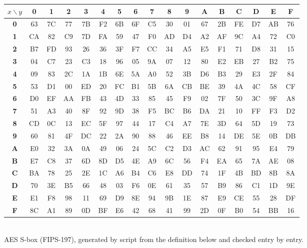 \begin{center}
\small\ttfamily\setlength{\tabcolsep}{4pt}\renewcommand{\arraystretch}{1.05}
\begin{tabular}{@{}>{\columncolor{acc!10}}c|*{16}{c}@{}}
\rowcolor{acc!10}$x\backslash y$ & \textbf{0}&\textbf{1}&\textbf{2}&\textbf{3}&\textbf{4}&\textbf{5}&\textbf{6}&\textbf{7}&\textbf{8}&\textbf{9}&\textbf{A}&\textbf{B}&\textbf{C}&\textbf{D}&\textbf{E}&\textbf{F}\\\hline
\textbf{0} & 63 & 7C & 77 & 7B & F2 & 6B & 6F & C5 & 30 & 01 & 67 & 2B & FE & D7 & AB & 76\\
\textbf{1} & CA & 82 & C9 & 7D & FA & 59 & 47 & F0 & AD & D4 & A2 & AF & 9C & A4 & 72 & C0\\
\textbf{2} & B7 & FD & 93 & 26 & 36 & 3F & F7 & CC & 34 & A5 & E5 & F1 & 71 & D8 & 31 & 15\\
\textbf{3} & 04 & C7 & 23 & C3 & 18 & 96 & 05 & 9A & 07 & 12 & 80 & E2 & EB & 27 & B2 & 75\\
\textbf{4} & 09 & 83 & 2C & 1A & 1B & 6E & 5A & A0 & 52 & 3B & D6 & B3 & 29 & E3 & 2F & 84\\
\textbf{5} & 53 & D1 & 00 & ED & 20 & FC & B1 & 5B & 6A & CB & BE & 39 & 4A & 4C & 58 & CF\\
\textbf{6} & D0 & EF & AA & FB & 43 & 4D & 33 & 85 & 45 & F9 & 02 & 7F & 50 & 3C & 9F & A8\\
\textbf{7} & 51 & A3 & 40 & 8F & 92 & 9D & 38 & F5 & BC & B6 & DA & 21 & 10 & FF & F3 & D2\\
\textbf{8} & CD & 0C & 13 & EC & 5F & 97 & 44 & 17 & C4 & A7 & 7E & 3D & 64 & 5D & 19 & 73\\
\textbf{9} & 60 & 81 & 4F & DC & 22 & 2A & 90 & 88 & 46 & EE & B8 & 14 & DE & 5E & 0B & DB\\
\textbf{A} & E0 & 32 & 3A & 0A & 49 & 06 & 24 & 5C & C2 & D3 & AC & 62 & 91 & 95 & E4 & 79\\
\textbf{B} & E7 & C8 & 37 & 6D & 8D & D5 & 4E & A9 & 6C & 56 & F4 & EA & 65 & 7A & AE & 08\\
\textbf{C} & BA & 78 & 25 & 2E & 1C & A6 & B4 & C6 & E8 & DD & 74 & 1F & 4B & BD & 8B & 8A\\
\textbf{D} & 70 & 3E & B5 & 66 & 48 & 03 & F6 & 0E & 61 & 35 & 57 & B9 & 86 & C1 & 1D & 9E\\
\textbf{E} & E1 & F8 & 98 & 11 & 69 & D9 & 8E & 94 & 9B & 1E & 87 & E9 & CE & 55 & 28 & DF\\
\textbf{F} & 8C & A1 & 89 & 0D & BF & E6 & 42 & 68 & 41 & 99 & 2D & 0F & B0 & 54 & BB & 16\\
\end{tabular}\\[2pt]
\rmfamily\small AES S-box (FIPS-197), generated by script from the definition below and checked entry by entry.
\end{center}

